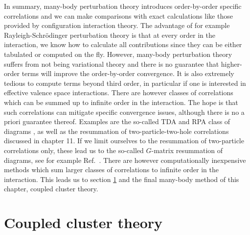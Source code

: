 In summary, many-body perturbation theory introduces order-by-order
specific correlations and we can make comparisons with exact
calculations like those provided by configuration interaction theory.
The advantage of for example Rayleigh-Schr\"odinger perturbation
theory is that at every order in the interaction, we know how to
calculate all contributions since they can be either tabulated or
computed on the fly.  However, many-body perturbation theory suffers
from not being variational theory and there is no guarantee that
higher-order terms will improve the order-by-order convergence.  It is
also extremely tedious to compute terms beyond third order, in
particular if one is interested in effective valence space
interactions.  There are however classes of correlations which can be
summed up to infinite order in the interaction.  The hope is that such
correlations can mitigate specific convergence issues, although there
is no a priori guarantee thereof.  Examples are the so-called TDA and
RPA class of diagrams \cite{ripkablaizot}, as well as the resummation
of two-particle-two-hole correlations discussed in chapter 11. If we limit ourselves to the
resummation of two-particle correlations only, these lead us to the
so-called $G$-matrix resummation of diagrams, see for example Ref.~\cite{day1967}.
There are however computationally inexpensive methods which
sum larger classes of correlations to infinite order in the
interaction. This leads us to section \ref{sec:chap8cctheory} and the final
many-body method of this chapter, coupled cluster theory. 


\section{Coupled cluster theory}\label{sec:chap8cctheory}
  
